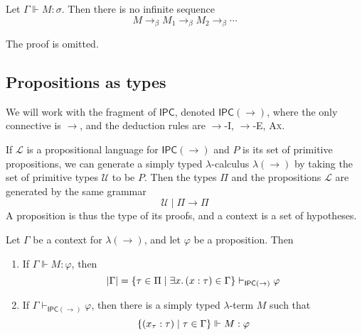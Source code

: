 \begin{theorem}
    Let \( \Gamma \Vdash M : \sigma \).
    Then there is no infinite sequence
    \[ M \to_\beta M_1 \to_\beta M_2 \to_\beta \cdots \]
\end{theorem}
The proof is omitted.

\subsection{Propositions as types}
We will work with the fragment of \( \mathsf{IPC} \), denoted \( \mathsf{IPC}(\to) \), where the only connective is \( \to \), and the deduction rules are \( \to \)-I, \( \to \)-E, \textsc{Ax}.

If \( \mathcal L \) is a propositional language for \( \mathsf{IPC}(\to) \) and \( P \) is its set of primitive propositions, we can generate a simply typed \( \lambda \)-calculus \( \lambda(\to) \) by taking the set of primitive types \( \mathcal U \) to be \( P \).
Then the types \( \Pi \) and the propositions \( \mathcal L \) are generated by the same grammar
\[ \mathcal U \mid \Pi \to \Pi \]
A proposition is thus the type of its proofs, and a context is a set of hypotheses.
\begin{proposition}
    Let \( \Gamma \) be a context for \( \lambda(\to) \), and let \( \varphi \) be a proposition.
    Then
    \begin{enumerate}
        \item If \( \Gamma \Vdash M : \varphi \), then
        \[ \abs{\Gamma} = \qty{\tau \in \Pi \mid \exists x.\, (x : \tau) \in \Gamma} \vdash_{\mathsf{IPC}(\to)} \varphi \]
        \item If \( \Gamma \vdash_{\mathsf{IPC}(\to)} \varphi \), then there is a simply typed \( \lambda \)-term \( M \) such that
        \[ \qty{(x_\tau : \tau) \mid \tau \in \Gamma} \Vdash M : \varphi \]
    \end{enumerate}
\end{proposition}
